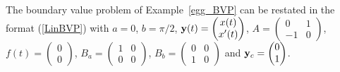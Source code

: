 \begin{egg}
The boundary value problem of Example~\ref{egg_BVP} can be restated in
the format (\ref{LinBVP}) with $a=0$, $b=\pi/2$,
$\displaystyle \mathbf{y}(t) = \begin{pmatrix} x(t) \\ x'(t) \end{pmatrix}$, 
$\displaystyle A = \begin{pmatrix} 0 & 1 \\ -1 & 0 \end{pmatrix}$,
$\displaystyle f(t) = \begin{pmatrix} 0 \\ 0 \end{pmatrix}$,
$\displaystyle B_a = \begin{pmatrix} 1 & 0 \\ 0 & 0 \end{pmatrix}$,
$\displaystyle B_b = \begin{pmatrix} 0 & 0 \\ 1 & 0 \end{pmatrix}$ and
$\mathbf{y}_c = \begin{pmatrix} 0 \\ 1 \end{pmatrix}$.


\end{egg}
